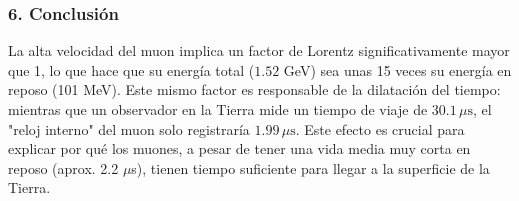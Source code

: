 \subsubsection*{6. Conclusión}
\begin{cajaconclusion}
La alta velocidad del muon implica un factor de Lorentz significativamente mayor que 1, lo que hace que su energía total ($1.52$ GeV) sea unas 15 veces su energía en reposo (101 MeV). Este mismo factor es responsable de la dilatación del tiempo: mientras que un observador en la Tierra mide un tiempo de viaje de $30.1 \, \mu\text{s}$, el "reloj interno" del muon solo registraría $1.99 \, \mu\text{s}$. Este efecto es crucial para explicar por qué los muones, a pesar de tener una vida media muy corta en reposo (aprox. 2.2 $\mu$s), tienen tiempo suficiente para llegar a la superficie de la Tierra.
\end{cajaconclusion}

\newpage
